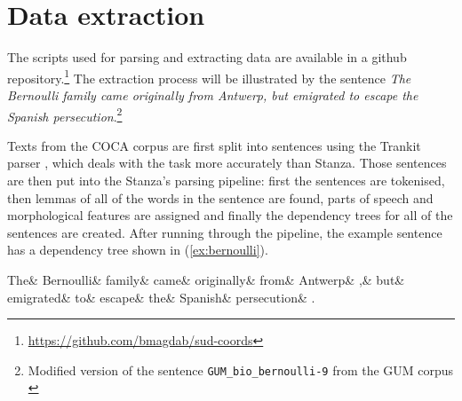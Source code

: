 \newpage

\section{Data extraction}

The scripts used for parsing and extracting data are available in a github repository.\footnote{\url{https://github.com/bmagdab/sud-coords}} The extraction process will be illustrated by the sentence \textsl{The Bernoulli family came originally from Antwerp, but emigrated to escape the Spanish persecution}.\footnote{Modified version of the sentence \texttt{GUM\_bio\_bernoulli-9} from the GUM corpus \citep{Zeldes2017}} 

Texts from the COCA corpus are first split into sentences using the Trankit parser \citep{nguyen2021trankit}, which deals with the task more accurately than Stanza. Those sentences are then put into the Stanza's parsing pipeline: first the sentences are tokenised, then lemmas of all of the words in the sentence are found, parts of speech and morphological features are assigned and finally the dependency trees for all of the sentences are created. After running through the pipeline, the example sentence has a dependency tree shown in (\ref{ex:bernoulli}). 

\begin{adjustwidth}{-90pt}{70pt}
\small
\begin{exe}
\ex\label{ex:bernoulli}
\begin{dependency}[baseline=-\the\dimexpr\fontdimen22\textfont2\relax]
	\begin{deptext}
		 The\& Bernoulli\& family\& came\& originally\& from\& Antwerp\& ,\& but\& emigrated\& to\& escape\& the\& Spanish\& persecution\& .\\
	 \end{deptext} 
\end{dependency}
\end{exe}
\end{adjustwidth}

